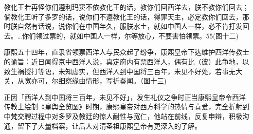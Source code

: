 \vfill
\begin{BookNotes}
\end{BookNotes}


\noindent 教化王若再怪你们遵利玛窦不依教化王的话，教你们回西洋去，朕不教你们回去；倘教化王听了多罗的话，说你们不遵教化王的话，得罪天主，必定教你们回去，那时朕自然有话说，说你们在中国年久，服朕水土，就如中国人一样，必不肯打发回去。…你们领过票的，就如中国人一样，尔等放心，不要害怕领票。55(图十二)

康熙五十四年，直隶省领票西洋人与民众起了纷争，康熙皇帝下达维护西洋传教士的谕旨：近日闻得京中西洋人说，真定府内有票西洋人，偶有比（彼）此争地，以致生祸授打等语，未知虚实，但西洋人到中国将三百年，未见不好处，若事无大关，从宽亦可，尔细察缘由情形，写折奏闻。（图十三)

\vfill
\begin{BookNotes}
\end{BookNotes}



\noindent 正因「西洋人到中国将三百年，未见不好」，发生礼仪之争时正当康熙皇帝令西洋传教士绘制《皇舆全览图》时期，康熙皇帝对西方科学的热情与喜爱，完全折射到中梵交聘过程中对多罗及教廷的惊人耐性与宽仁，他站在前线，反复申辩，积极沟通，留下了大量档案，让后人对清圣祖康熙皇帝有更深入的了解。





